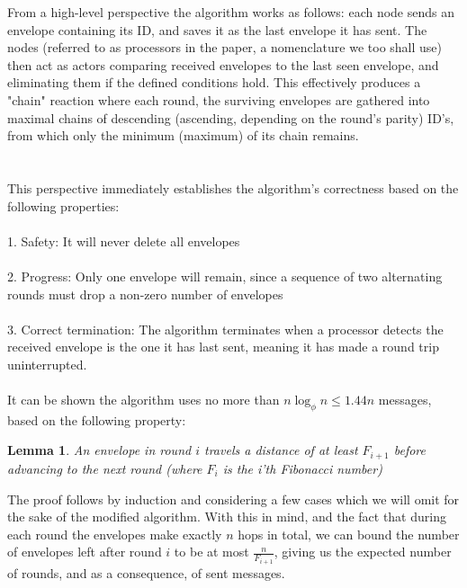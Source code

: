 \documentclass{article}
\newtheorem{lemma}{Lemma}
\begin{document}
From a high-level perspective the algorithm works as follows: each node sends an envelope containing its ID, and saves it as the last envelope it has sent. The nodes (referred to as processors in the paper, a nomenclature we too shall use) then act as actors comparing received envelopes to the last seen envelope, and eliminating them if the defined conditions hold. This effectively produces a "chain" reaction where each round, the surviving envelopes are gathered into maximal chains of descending (ascending, depending on the round's parity) ID's, from which only the minimum (maximum) of its chain remains.
\\\\\\
\newpage
This perspective immediately establishes the algorithm's correctness based on the following properties:
\\\\
1. Safety: It will never delete all envelopes \\
\\
2. Progress: Only one envelope will remain, since a sequence of two alternating rounds must drop a non-zero number of envelopes \\
\\
3. Correct termination: The algorithm terminates when a processor detects the received envelope is the one it has last sent, meaning it has made a round trip uninterrupted. \\
\\
It can be shown the algorithm uses no more than $n\log_{\phi}{n} \leq 1.44n$ messages, based on the following property:\\

\begin{lemma}
An envelope in round $i$ travels a distance of at least $F_{i+1}$ before advancing to the next round (where $F_i$ is the i'th Fibonacci number)
\end{lemma}
The proof follows by induction and considering a few cases which we will omit for the sake of the modified algorithm.
With this in mind, and the fact that during each round the envelopes make exactly $n$ hops in total, we can bound the number of envelopes left after round $i$ to be at most $\frac{n}{F_{i+1}}$, giving us the expected number of rounds, and as a consequence, of sent messages.
\end{document}

